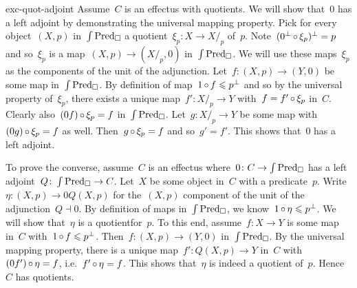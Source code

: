 \begin{solution}{exc-quot-adjoint}%
Assume~$C$ is an effectus with quotients.
We will show that~$0$ has a left adjoint by demonstrating the universal mapping property.
Pick for every object~$(X,p)$ in~$\int \operatorname{Pred}_\square$
    a quotient~$\xi_p \colon X \to X/_p$ of~$p$.
    Note~$(0^\perp \mathop{\circ} \xi_p)^\perp = p$
        and so~$\xi_p$ is a map~$(X,p) \to (X/_p, 0)$ in~$\int \operatorname{Pred}_\square$.
We will use these maps~$\xi_p$ as the components of  the unit of the adjunction.
    Let~$f \colon (X,p) \to (Y,0)$ be some map in~$\int \operatorname{Pred}_\square$.
By definition of map~$1 \mathop{\circ} f \leqslant p^\perp$
    and so by the universal property of~$\xi_p$,
    there exists a unique map~$f'\colon X/_p \to Y $
        with~$f = f' \mathop{\circ} \xi_p$ in~$C$.
        Clearly also~$(0 f) \mathop{\circ} \xi_p = f$ in~$\int\operatorname{Pred}_\square$.
Let~$g\colon X/_p \to Y$ be some map with~$(0 g) \mathop{\circ} \xi_p = f$
    as well.
    Then~$g \mathop{\circ} \xi_p = f$ and so~$g' = f'$.
This shows that~$0$ has a left adjoint.

To prove the converse, assume~$C$ is an effectus
    where~$0\colon C \to \int\operatorname{Pred}_\square$ has a left adjoint~$Q\colon \int \operatorname{Pred}_\square \to C$.
Let~$X$ be some object in~$C$ with a predicate~$p$.
    Write~$\eta \colon (X,p) \to 0Q(X,p)$
        for the~$(X,p)$ component of the unit of the adjunction~$Q \dashv 0$.
By definition of maps in~$\int \operatorname{Pred}_\square$,
    we know~$1 \mathop{\circ} \eta \leqslant p^\perp$.
We will show that~$\eta$ is a quotientfor~$p$.
To this end, assume~$f\colon X \to Y$ is some map in~$C$
    with~$1 \mathop{\circ} f \leqslant p^\perp$.
Then~$f\colon (X,p) \to (Y,0)$ in~$\int \operatorname{Pred}_\square$.
By the universal mapping property,
    there is a unique map~$f'\colon Q(X,p) \to Y$ in~$C$
    with~$(0f')\mathop{\circ} \eta = f$, i.e.~$f' \mathop{\circ} \eta = f$.
This shows that~$\eta$ is indeed a quotient of~$p$.
Hence~$C$ has quotients.
\end{solution}
